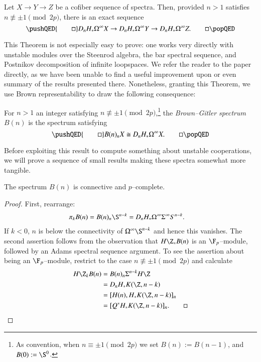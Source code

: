 \begin{theorem}
Let $X \to Y \to Z$ be a cofiber sequence of spectra.  Then, provided $n > 1$ satisfies $n \not\equiv \pm 1 \pmod{2p}$, there is an exact sequence
\[\pushQED{\qed}
D_n H_* \Loops^\infty X \to D_n H_* \Loops^\infty Y \to D_n H_* \Loops^\infty Z. \qedhere
\popQED\]
\end{theorem}

\noindent This Theorem is not especially easy to prove: one works very directly with unstable modules over the Steenrod algebra, the bar spectral sequence, and Postnikov decomposition of infinite loopspaces.  We refer the reader to the paper directly, as we have been unable to find a useful improvement upon or even summary of the results presented there.  Nonetheless, granting this Theorem, we use Brown representability to draw the following consequence:

\begin{corollary}\label{BrownGitlerSpectraDefn}
For $n > 1$ an integer satisfying $n \not\equiv \pm 1 \pmod{2p}$,\footnote{As convention, when $n \equiv \pm 1 \pmod{2p}$ we set $B(n) := B(n-1)$, and $B(0) := \S^0$.} the \textit{Brown--Gitler spectrum} $B(n)$ is the spectrum satisfying \[\pushQED{\qed}B(n)_n X \cong D_n H_* \Loops^\infty X. \qedhere\popQED\]
\end{corollary}

Before exploiting this result to compute something about unstable cooperations, we will prove a sequence of small results making these spectra somewhat more tangible.

\begin{lemma}
The spectrum $B(n)$ is connective and $p$--complete.
\end{lemma}
\begin{proof}
First, rearrange:
\begin{align*}
\pi_k B(n) & = B(n)_n \S^{n-k} = D_n H_* \Loops^\infty \Susp^\infty S^{n-k}.
\end{align*}
If $k < 0$, $n$ is below the connectivity of $\Loops^\infty \S^{n-k}$ and hence this vanishes.  The second assertion follows from the observation that $H\Z_* B(n)$ is an $\F_p$--module, followed by an Adams spectral sequence argument.  To see the assertion about being an $\F_p$--module, restrict to the case $n \not\equiv \pm 1 \pmod{2p}$ and calculate
\begin{align*}
H\Z_k B(n) & = B(n)_n \Susp^{n-k} H\Z \\
& = D_n H_* K(\Z, n-k) \\
& = [H(n), H_* K(\Z, n-k)]_n \\
& = [Q^* H_* K(\Z, n-k)]_n. \qedhere
\end{align*}
\end{proof}

